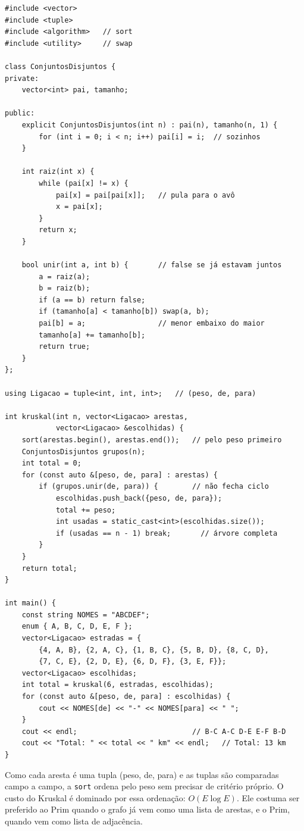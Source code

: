 \begin{codigo}
\begin{Verbatim}[breaklines=true, breaksymbolleft={}, fontsize=\footnotesize]
#include <vector>
#include <tuple>
#include <algorithm>   // sort
#include <utility>     // swap

class ConjuntosDisjuntos {
private:
    vector<int> pai, tamanho;

public:
    explicit ConjuntosDisjuntos(int n) : pai(n), tamanho(n, 1) {
        for (int i = 0; i < n; i++) pai[i] = i;  // sozinhos
    }

    int raiz(int x) {
        while (pai[x] != x) {
            pai[x] = pai[pai[x]];   // pula para o avô
            x = pai[x];
        }
        return x;
    }

    bool unir(int a, int b) {       // false se já estavam juntos
        a = raiz(a);
        b = raiz(b);
        if (a == b) return false;
        if (tamanho[a] < tamanho[b]) swap(a, b);
        pai[b] = a;                 // menor embaixo do maior
        tamanho[a] += tamanho[b];
        return true;
    }
};

using Ligacao = tuple<int, int, int>;   // (peso, de, para)

int kruskal(int n, vector<Ligacao> arestas,
            vector<Ligacao> &escolhidas) {
    sort(arestas.begin(), arestas.end());   // pelo peso primeiro
    ConjuntosDisjuntos grupos(n);
    int total = 0;
    for (const auto &[peso, de, para] : arestas) {
        if (grupos.unir(de, para)) {        // não fecha ciclo
            escolhidas.push_back({peso, de, para});
            total += peso;
            int usadas = static_cast<int>(escolhidas.size());
            if (usadas == n - 1) break;       // árvore completa
        }
    }
    return total;
}

int main() {
    const string NOMES = "ABCDEF";
    enum { A, B, C, D, E, F };
    vector<Ligacao> estradas = {
        {4, A, B}, {2, A, C}, {1, B, C}, {5, B, D}, {8, C, D},
        {7, C, E}, {2, D, E}, {6, D, F}, {3, E, F}};
    vector<Ligacao> escolhidas;
    int total = kruskal(6, estradas, escolhidas);
    for (const auto &[peso, de, para] : escolhidas) {
        cout << NOMES[de] << "-" << NOMES[para] << " ";
    }
    cout << endl;                           // B-C A-C D-E E-F B-D
    cout << "Total: " << total << " km" << endl;   // Total: 13 km
}
\end{Verbatim}
\end{codigo}

Como cada aresta é uma tupla (peso, de, para) e as tuplas são comparadas campo a campo, a \texttt{sort} ordena pelo peso sem precisar de critério próprio. O custo do Kruskal é dominado por essa ordenação: $O(E \log E)$. Ele costuma ser preferido ao Prim quando o grafo já vem como uma lista de arestas, e o Prim, quando vem como lista de adjacência.

